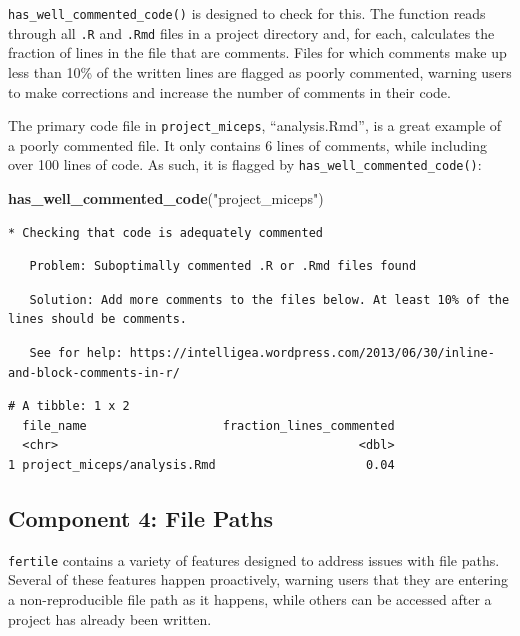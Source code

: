 \documentclass[12pt,twoside]{reedthesis}
\newenvironment{Shaded}{\begin{snugshade}}{\end{snugshade}}
\newcommand{\KeywordTok}[1]{\textcolor[rgb]{0.13,0.29,0.53}{\textbf{#1}}}
\newcommand{\StringTok}[1]{\textcolor[rgb]{0.31,0.60,0.02}{#1}}
\newcommand{\NormalTok}[1]{#1}
\begin{document}
\texttt{has\_well\_commented\_code()} is designed to check for this. The
function reads through all \texttt{.R} and \texttt{.Rmd} files in a
project directory and, for each, calculates the fraction of lines in the
file that are comments. Files for which comments make up less than 10\%
of the written lines are flagged as poorly commented, warning users to
make corrections and increase the number of comments in their code.

The primary code file in \texttt{project\_miceps}, ``analysis.Rmd'', is
a great example of a poorly commented file. It only contains 6 lines of
comments, while including over 100 lines of code. As such, it is flagged
by \texttt{has\_well\_commented\_code()}:
\begin{Shaded}
\begin{Highlighting}[]
\KeywordTok{has_well_commented_code}\NormalTok{(}\StringTok{"project_miceps"}\NormalTok{)}
\end{Highlighting}
\end{Shaded}
\begin{verbatim}
* Checking that code is adequately commented
\end{verbatim}
\begin{verbatim}
   Problem: Suboptimally commented .R or .Rmd files found
\end{verbatim}
\begin{verbatim}
   Solution: Add more comments to the files below. At least 10% of the lines should be comments.
\end{verbatim}
\begin{verbatim}
   See for help: https://intelligea.wordpress.com/2013/06/30/inline-and-block-comments-in-r/
\end{verbatim}
\begin{verbatim}
# A tibble: 1 x 2
  file_name                   fraction_lines_commented
  <chr>                                          <dbl>
1 project_miceps/analysis.Rmd                     0.04
\end{verbatim}
\subsection{Component 4: File Paths}\label{component-4-file-paths}

\texttt{fertile} contains a variety of features designed to address
issues with file paths. Several of these features happen proactively,
warning users that they are entering a non-reproducible file path as it
happens, while others can be accessed after a project has already been
written.
\end{document}
